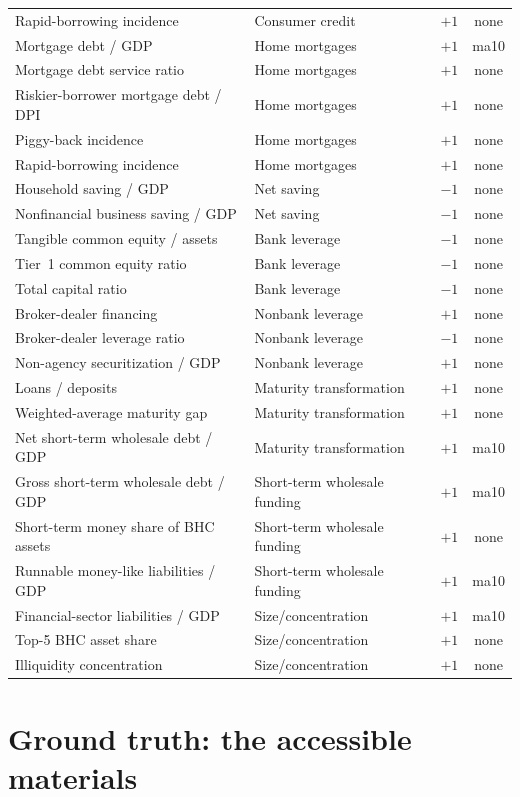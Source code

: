 \documentclass[11pt]{article}
\begin{document}
\begin{longtable}{llcc}
Rapid-borrowing incidence & Consumer credit & $+1$ & none \\
Mortgage debt / GDP & Home mortgages & $+1$ & ma10 \\
Mortgage debt service ratio & Home mortgages & $+1$ & none \\
Riskier-borrower mortgage debt / DPI & Home mortgages & $+1$ & none \\
Piggy-back incidence & Home mortgages & $+1$ & none \\
Rapid-borrowing incidence & Home mortgages & $+1$ & none \\
Household saving / GDP & Net saving & $-1$ & none \\
Nonfinancial business saving / GDP & Net saving & $-1$ & none \\
Tangible common equity / assets & Bank leverage & $-1$ & none \\
Tier~1 common equity ratio & Bank leverage & $-1$ & none \\
Total capital ratio & Bank leverage & $-1$ & none \\
Broker-dealer financing & Nonbank leverage & $+1$ & none \\
Broker-dealer leverage ratio & Nonbank leverage & $-1$ & none \\
Non-agency securitization / GDP & Nonbank leverage & $+1$ & none \\
Loans / deposits & Maturity transformation & $+1$ & none \\
Weighted-average maturity gap & Maturity transformation & $+1$ & none \\
Net short-term wholesale debt / GDP & Maturity transformation & $+1$ & ma10 \\
Gross short-term wholesale debt / GDP & Short-term wholesale funding & $+1$ & ma10 \\
Short-term money share of BHC assets & Short-term wholesale funding & $+1$ & none \\
Runnable money-like liabilities / GDP & Short-term wholesale funding & $+1$ & ma10 \\
Financial-sector liabilities / GDP & Size/concentration & $+1$ & ma10 \\
Top-5 BHC asset share & Size/concentration & $+1$ & none \\
Illiquidity concentration & Size/concentration & $+1$ & none \\
\bottomrule
\end{longtable}

\section{Ground truth: the accessible materials}
\label{sec:groundtruth}
\end{document}
